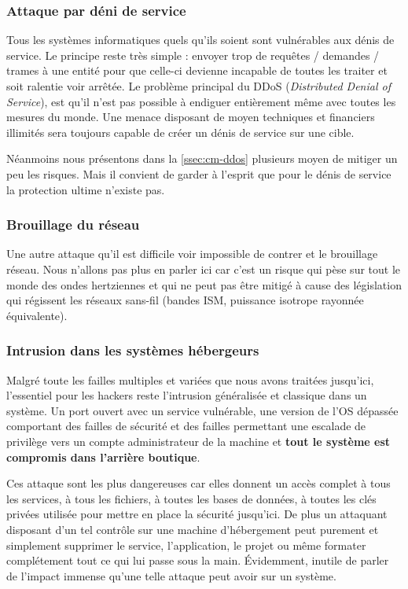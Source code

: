 \documentclass[12pt]{article}
\begin{document}
\subsubsection{Attaque par déni de service}

Tous les systèmes informatiques quels qu'ils soient sont vulnérables aux dénis de service. Le principe reste très simple : envoyer trop de requêtes / demandes / trames à une entité pour que celle-ci devienne incapable de toutes les traiter et soit ralentie voir arrêtée. Le problème principal du DDoS (\emph{Distributed Denial of Service}), est qu'il n'est pas possible à endiguer entièrement même avec toutes les mesures du monde. Une menace disposant de moyen techniques et financiers illimités sera toujours capable de créer un dénis de service sur une cible.

Néanmoins nous présentons dans la \autoref{ssec:cm-ddos} plusieurs moyen de mitiger un peu les risques. Mais il convient de garder à l'esprit que pour le dénis de service la protection ultime n'existe pas.

\subsubsection{Brouillage du réseau}

Une autre attaque qu'il est difficile voir impossible de contrer et le brouillage réseau. Nous n'allons pas plus en parler ici car c'est un risque qui pèse sur tout le monde des ondes hertziennes et qui ne peut pas être mitigé à cause des législation qui régissent les réseaux sans-fil (bandes ISM, puissance isotrope rayonnée équivalente).

\subsubsection{Intrusion dans les systèmes hébergeurs}

Malgré toute les failles multiples et variées que nous avons traitées jusqu'ici, l'essentiel pour les hackers reste l'intrusion généralisée et classique dans un système. Un port ouvert avec un service vulnérable, une version de l'OS dépassée comportant des failles de sécurité et des failles permettant une escalade de privilège vers un compte administrateur de la machine et \textbf{tout le système est compromis dans l'arrière boutique}. 

Ces attaque sont les plus dangereuses car elles donnent un accès complet à tous les services, à tous les fichiers, à toutes les bases de données, à toutes les clés privées utilisée pour mettre en place la sécurité jusqu'ici. De plus un attaquant disposant d'un tel contrôle sur une machine d'hébergement peut purement et simplement supprimer le service, l'application, le projet ou même formater complétement tout ce qui lui passe sous la main.  Évidemment, inutile de parler de l'impact immense qu'une telle attaque peut avoir sur un système.
\end{document}
